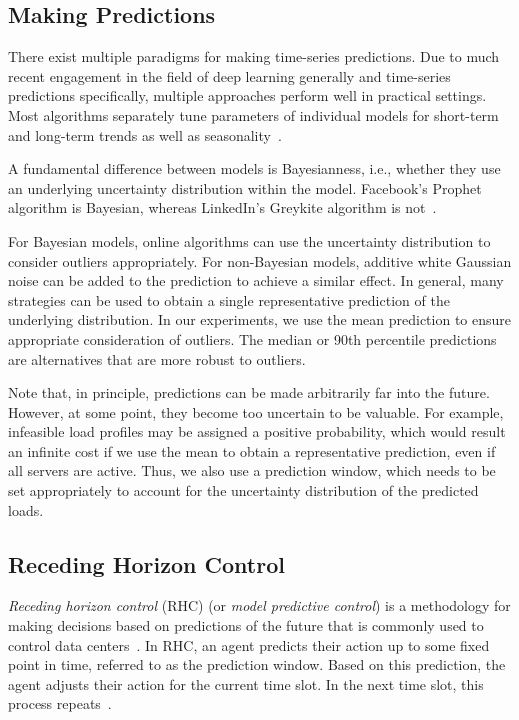 \subsection{Making Predictions}\label{section:online_algorithms:md:predictions:making_predictions}

There exist multiple paradigms for making time-series predictions. Due to much recent engagement in the field of deep learning generally and time-series predictions specifically, multiple approaches perform well in practical settings. Most algorithms separately tune parameters of individual models for short-term and long-term trends as well as seasonality~\cite{Taylor2017, Hosseini2021}.

A fundamental difference between models is Bayesianness, i.e., whether they use an underlying uncertainty distribution within the model. Facebook's Prophet algorithm is Bayesian, whereas LinkedIn's Greykite algorithm is not~\cite{Taylor2017, Hosseini2021}.

For Bayesian models, online algorithms can use the uncertainty distribution to consider outliers appropriately. For non-Bayesian models, additive white Gaussian noise can be added to the prediction to achieve a similar effect. In general, many strategies can be used to obtain a single representative prediction of the underlying distribution. In our experiments, we use the mean prediction to ensure appropriate consideration of outliers. The median or 90th percentile predictions are alternatives that are more robust to outliers.

Note that, in principle, predictions can be made arbitrarily far into the future. However, at some point, they become too uncertain to be valuable. For example, infeasible load profiles may be assigned a positive probability, which would result an infinite cost if we use the mean to obtain a representative prediction, even if all servers are active. Thus, we also use a prediction window, which needs to be set appropriately to account for the uncertainty distribution of the predicted loads.

\subsection{Receding Horizon Control}

\emph{Receding horizon control} (RHC) (or \emph{model predictive control}) is a methodology for making decisions based on predictions of the future that is commonly used to control data centers~\cite{Lin2012}. In RHC, an agent predicts their action up to some fixed point in time, referred to as the prediction window. Based on this prediction, the agent adjusts their action for the current time slot. In the next time slot, this process repeats~\cite{Zak2017}.

